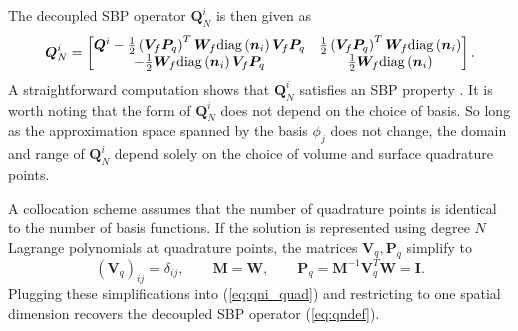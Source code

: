 \documentclass[review,onefignum,onetabnum,final]{siamart171218}
\newcommand{\LRp}[1]{\left( #1 \right)}
\newcommand{\note}[1]{{\color{blue}{#1}}}
\newcommand{\diag}[1]{{\rm diag}\LRp{#1}}
\begin{document}
The decoupled SBP operator $\bm{Q}_N^i$ is then given as
\begin{equation}
\bm{Q}_N^i = \begin{bmatrix}
\bm{Q}^i - \frac{1}{2}\LRp{\bm{V}_f\bm{P}_q}^T\bm{W}_f \diag{\bm{n}_i}{\bm{V}_f\bm{P}_q} & \frac{1}{2}\LRp{\bm{V}_f\bm{P}_q}^T\bm{W}_f \diag{\bm{n}_i}\\
-\frac{1}{2}\bm{W}_f \diag{\bm{n}_i}{\bm{V}_f\bm{P}_q} & \frac{1}{2}\bm{W}_f \diag{\bm{n}_i}
\end{bmatrix}.
\label{eq:qni_quad}
\end{equation}
A straightforward computation shows that $\bm{Q}_N^i$ satisfies an SBP property \cite{chan2017discretely}.  
It is worth noting that the form of $\bm{Q}_N^i$ does not depend on the choice of basis.  So long as the approximation space spanned by the basis $\phi_j$ does not change, the domain and range of $\bm{Q}_N^i$ depend solely on the choice of volume and surface quadrature points.  

A collocation scheme assumes that the number of quadrature points is identical to the number of basis functions.  If the solution is represented using degree $N$ Lagrange polynomials at quadrature points, the matrices $\bm{V}_q, \bm{P}_q$ simplify to
\[
\LRp{\bm{V}_q}_{ij} = \delta_{ij}, \qquad \bm{M} = \bm{W}, \qquad \bm{P}_q = \bm{M}^{-1}\bm{V}_q^T\bm{W} = \bm{I}.
\]
Plugging these simplifications into (\ref{eq:qni_quad}) and restricting to one spatial dimension recovers the decoupled SBP operator (\ref{eq:qndef}).




\end{document}
